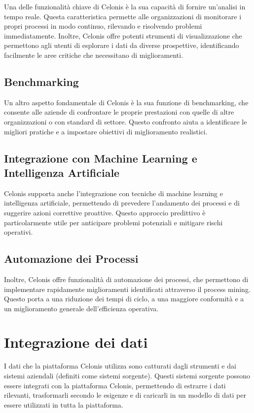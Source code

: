 \documentclass{article}
\begin{document}
Una delle funzionalità chiave di Celonis è la sua capacità di fornire un'analisi in tempo reale. Questa caratteristica permette alle organizzazioni di monitorare i propri processi in modo continuo, rilevando e risolvendo problemi immediatamente. Inoltre, Celonis offre potenti strumenti di visualizzazione che permettono agli utenti di esplorare i dati da diverse prospettive, identificando facilmente le aree critiche che necessitano di miglioramenti.

\subsection{Benchmarking}

Un altro aspetto fondamentale di Celonis è la sua funzione di benchmarking, che consente alle aziende di confrontare le proprie prestazioni con quelle di altre organizzazioni o con standard di settore. Questo confronto aiuta a identificare le migliori pratiche e a impostare obiettivi di miglioramento realistici.

\subsection{Integrazione con Machine Learning e Intelligenza Artificiale}

Celonis supporta anche l'integrazione con tecniche di machine learning e intelligenza artificiale, permettendo di prevedere l'andamento dei processi e di suggerire azioni correttive proattive. Questo approccio predittivo è particolarmente utile per anticipare problemi potenziali e mitigare rischi operativi.

\subsection{Automazione dei Processi}

Inoltre, Celonis offre funzionalità di automazione dei processi, che permettono di implementare rapidamente miglioramenti identificati attraverso il process mining. Questo porta a una riduzione dei tempi di ciclo, a una maggiore conformità e a un miglioramento generale dell'efficienza operativa.


\section{Integrazione dei dati}
I dati che la piattaforma Celonis utilizza sono catturati dagli strumenti e dai sistemi aziendali (definiti come sistemi sorgente). Questi sistemi sorgente possono essere integrati con la piattaforma Celonis, permettendo di estrarre i dati rilevanti, trasformarli secondo le esigenze e di caricarli in un modello di dati per essere utilizzati in tutta la piattaforma.
\end{document}
